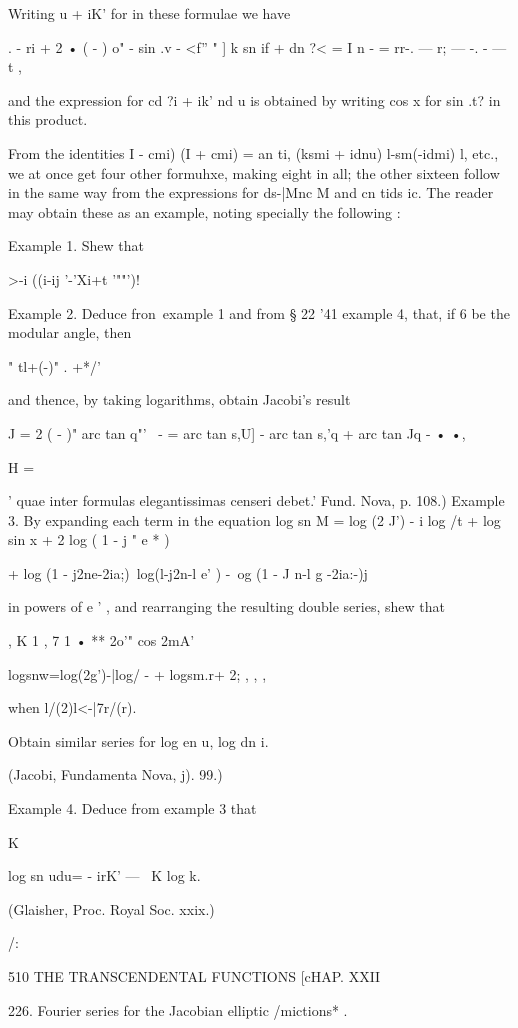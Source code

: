 Writing u + iK' for in these formulae we have

. - ri + 2 • ( - ) o" - sin .v - <f'' " ] k sn if + dn ?< = I n - =
rr-. — r; — -. - — t ,

and the expression for cd ?i + ik' nd u is obtained by writing cos x
for sin .t? in this product.

From the identities I - cmi) (I + cmi) = an ti, (ksmi + idnu)
l-sm(-idmi) l, etc., we at once get four other formuhxe, making eight
in all; the other sixteen follow in the same way from the expressions
for ds-|Mnc M and cn tids ic. The reader may obtain these as an
example, noting specially the following :

Example 1. Shew that

  >-i ((i-ij '-'Xi+t '""')!

Example 2. Deduce fron\ example 1 and from § 22 '41 example 4, that,
if 6 be the modular angle, then

" tl+(-)" . +*/'

and thence, by taking logarithms, obtain Jacobi's result

J = 2 ( - )" arc tan q"'~ - = arc tan s,U] - arc tan s,'q + arc tan Jq
- • •,

H =

' quae inter formulas elegantissimas censeri debet.' Fund. Nova, p.
108.) Example 3. By expanding each term in the equation log sn M = log
(2 J') - i log /t + log sin x + 2 log ( 1 - j " e * )

+ log (1 - j2ne-2ia;)\ log(l-j2n-l e' ) -\ og (1 - J n-l g -2ia:-)j

in powers of e ' , and rearranging the resulting double series, shew
that

, K 1 , 7 1 • ** 2o'" cos 2mA'

logsnw=log(2g')-|log/ - + logsm.r+ 2; , , ,

when l/(2)l<-|7r/(r).

Obtain similar series for log en u, log dn i.

(Jacobi, Fundamenta Nova, j). 99.)

Example 4. Deduce from example 3 that

 K

log sn udu= - irK' — \ K log k.

(Glaisher, Proc. Royal Soc. xxix.)

/:

510 THE TRANSCENDENTAL FUNCTIONS [cHAP. XXII

226. Fourier series for the Jacobian elliptic /mictions* .

